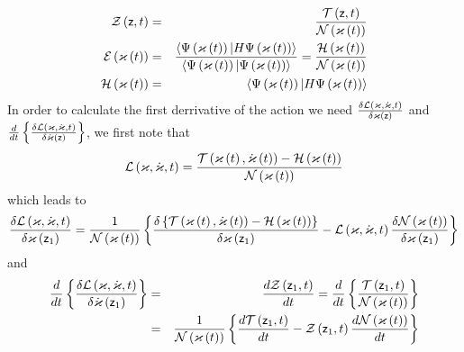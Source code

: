 \begin{eqnarray}
{\cal Z}\left( {\sf z},t\right) &=&\frac{{\cal T}\left( {\sf z},t\right) }{%
{\cal N}\left( {\cal \varkappa }\left( t\right) \right) } \\
{\cal E}\left( {\cal \varkappa }\left( t\right) \right) &=&\frac{%
\left\langle \Psi \left( {\cal \varkappa }\left( t\right) \right) |H\Psi
\left( {\cal \varkappa }\left( t\right) \right) \right\rangle }{\left\langle
\Psi \left( {\cal \varkappa }\left( t\right) \right) |\Psi \left( {\cal %
\varkappa }\left( t\right) \right) \right\rangle }=\frac{{\cal H}\left( 
{\cal \varkappa }\left( t\right) \right) }{{\cal N}\left( {\cal \varkappa }%
\left( t\right) \right) } \\
{\cal H}\left( {\cal \varkappa }\left( t\right) \right) &=&\left\langle \Psi
\left( {\cal \varkappa }\left( t\right) \right) |H\Psi \left( {\cal %
\varkappa }\left( t\right) \right) \right\rangle
\end{eqnarray}%
In order to calculate the first derrivative of the action we need $\frac{%
\delta {\cal L}\left( {\cal \varkappa },{\cal \dot{\varkappa}},t\right) }{%
\delta {\cal \varkappa }\left( {\sf z}\right) }$ and $\frac{d}{dt}\left\{ 
\frac{\delta {\cal L}\left( {\cal \varkappa },{\cal \dot{\varkappa}}%
,t\right) }{\delta {\cal \dot{\varkappa}}\left( {\sf z}\right) }\right\} $,
we first note that 
\begin{equation}
{\cal L}\left( {\cal \varkappa },{\cal \dot{\varkappa}},t\right) =\frac{%
{\cal T}\left( {\cal \varkappa }\left( t\right) ,{\cal \dot{\varkappa}}%
\left( t\right) \right) -{\cal H}\left( {\cal \varkappa }\left( t\right)
\right) }{{\cal N}\left( {\cal \varkappa }\left( t\right) \right) }
\end{equation}%
which leads to 
\begin{equation}
\frac{\delta {\cal L}\left( {\cal \varkappa },{\cal \dot{\varkappa}}%
,t\right) }{\delta {\cal \varkappa }\left( {\sf z}_{1}\right) }=\frac{1}{%
{\cal N}\left( {\cal \varkappa }\left( t\right) \right) }\left\{ \frac{%
\delta \left\{ {\cal T}\left( {\cal \varkappa }\left( t\right) ,{\cal \dot{%
\varkappa}}\left( t\right) \right) -{\cal H}\left( {\cal \varkappa }\left(
t\right) \right) \right\} }{\delta {\cal \varkappa }\left( {\sf z}%
_{1}\right) }-{\cal L}\left( {\cal \varkappa },{\cal \dot{\varkappa}}%
,t\right) \frac{\delta {\cal N}\left( {\cal \varkappa }\left( t\right)
\right) }{\delta {\cal \varkappa }\left( {\sf z}_{1}\right) }\right\}
\end{equation}%
and 
\begin{eqnarray}
\frac{d}{dt}\left\{ \frac{\delta {\cal L}\left( {\cal \varkappa },{\cal \dot{%
\varkappa}},t\right) }{\delta {\cal \dot{\varkappa}}\left( {\sf z}%
_{1}\right) }\right\} &=&\frac{d{\cal Z}\left( {\sf z}_{1},t\right) }{dt}=%
\frac{d}{dt}\left\{ \frac{{\cal T}\left( {\sf z}_{1},t\right) }{{\cal N}%
\left( {\cal \varkappa }\left( t\right) \right) }\right\}  \nonumber \\
&=&\frac{1}{{\cal N}\left( {\cal \varkappa }\left( t\right) \right) }\left\{ 
\frac{d{\cal T}\left( {\sf z}_{1},t\right) }{dt}-{\cal Z}\left( {\sf z}%
_{1},t\right) \frac{d{\cal N}\left( {\cal \varkappa }\left( t\right) \right) 
}{dt}\right\}
\end{eqnarray}%
